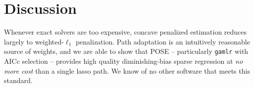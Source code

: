 \documentclass[12pt]{article}
\begin{document}
\section{Discussion}
\label{discussion}


Whenever exact solvers are too
 expensive, concave penalized estimation reduces largely to weighted-$\ell_1$ penalization.
Path adaptation is an intuitively reasonable source of weights, and we are able to show that POSE -- particularly {\tt gamlr} with AICc selection -- provides high quality diminishing-bias sparse regression at
{\it no more cost} than a  single lasso path.  We know of no other software that meets this standard.





\end{document}
